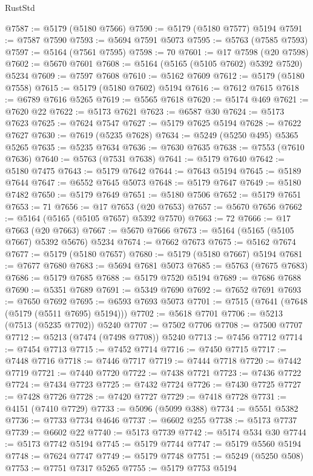 \begin{lexlean}{RustStd}
\begin{coremodule}
@7587 := @5179 (@5180 @7566)
@7590 := @5179 (@5180 @7577) @5194
@7591 := @7587 @7590
@7593 := @5694 @7591 @5073
@7595 := @5763 (@7585 @7593)
@7597 := @5164 (@7561 @7595)
@7598 := 70
@7601 := @17 @7598 (@20 @7598)
@7602 := @5670 @7601
@7608 := @5164 (@5165 (@5105 @7602) @5392 @7520) @5234
@7609 := @7597 @7608
@7610 := @5162 @7609
@7612 := @5179 (@5180 @7558)
@7615 := @5179 (@5180 @7602) @5194
@7616 := @7612 @7615
@7618 := @6789 @7616 @5265
@7619 := @5565 @7618
@7620 := @5174 @469
@7621 := @7620 @22
@7622 := @5173 @7621
@7623 := @6587 @30
@7624 := @5173 @7623
@7625 := @7624 @7547
@7627 := @5179 @7625 @5194
@7628 := @7622 @7627
@7630 := @7619 (@5235 @7628)
@7634 := @5249 (@5250 @495) @5365 @5265
@7635 := @5235 @7634
@7636 := @7630 @7635
@7638 := @7553 (@7610 @7636)
@7640 := @5763 (@7531 @7638)
@7641 := @5179 @7640
@7642 := @5180 @7475
@7643 := @5179 @7642
@7644 := @7643 @5194
@7645 := @5189 @7644
@7647 := @6552 @7645 @5073
@7648 := @5179 @7647
@7649 := @5180 @7482
@7650 := @5179 @7649
@7651 := @5180 @7506
@7652 := @5179 @7651
@7653 := 71
@7656 := @17 @7653 (@20 @7653)
@7657 := @5670 @7656
@7662 := @5164 (@5165 (@5105 @7657) @5392 @7570)
@7663 := 72
@7666 := @17 @7663 (@20 @7663)
@7667 := @5670 @7666
@7673 := @5164 (@5165 (@5105 @7667) @5392 @5676) @5234
@7674 := @7662 @7673
@7675 := @5162 @7674
@7677 := @5179 (@5180 @7657)
@7680 := @5179 (@5180 @7667) @5194
@7681 := @7677 @7680
@7683 := @5694 @7681 @5073
@7685 := @5763 (@7675 @7683)
@7686 := @5179 @7685
@7688 := @5179 @7520 @5194
@7689 := @7686 @7688
@7690 := @5351 @7689
@7691 := @5349 @7690
@7692 := @7652 @7691
@7693 := @7650 @7692
@7695 := @6593 @7693 @5073
@7701 := @7515 (@7641 (@7648 (@5179 (@5511 @7695) @5194)))
@7702 := @5618 @7701
@7706 := @5213 (@7513 (@5235 @7702)) @5240
@7707 := @7502 @7706
@7708 := @7500 @7707
@7712 := @5213 (@7474 (@7498 @7708)) @5240
@7713 := @7456 @7712
@7714 := @7454 @7713
@7715 := @7452 @7714
@7716 := @7450 @7715
@7717 := @7448 @7716
@7718 := @7446 @7717
@7719 := @7444 @7718
@7720 := @7442 @7719
@7721 := @7440 @7720
@7722 := @7438 @7721
@7723 := @7436 @7722
@7724 := @7434 @7723
@7725 := @7432 @7724
@7726 := @7430 @7725
@7727 := @7428 @7726
@7728 := @7420 @7727
@7729 := @7418 @7728
@7731 := @4151 (@7410 @7729)
@7733 := @5096 (@5099 @388)
@7734 := @5551 @5382
@7736 := @7733 @7734 @4646
@7737 := @6602 @255
@7738 := @5173 @7737
@7739 := @6602 @22
@7740 := @5173 @7739
@7742 := @5174 @534 @30
@7744 := @5173 @7742 @5194
@7745 := @5179 @7744
@7747 := @5179 @5560 @5194
@7748 := @7624 @7747
@7749 := @5179 @7748
@7751 := @5249 (@5250 @508)
@7753 := @7751 @7317 @5265
@7755 := @5179 @7753 @5194

\end{coremodule}
\end{lexlean}
